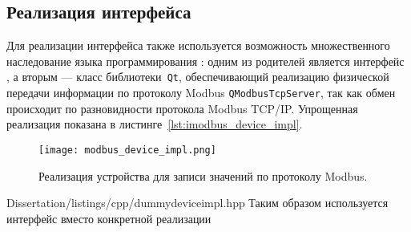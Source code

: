 \subsection{Реализация интерфейса \mbdevice}
Для реализации интерфейса \mbdevice также используется возможность множественного наследование языка программирования \cpp:
одним из родителей является интерфейс \mbdevice,
а вторым --- класс библиотеки~\texttt{Qt}, обеспечивающий реализацию физической передачи информации по протоколу Modbus
\texttt{QModbusTcpServer}, так как обмен происходит по разновидности протокола Modbus TCP/IP.
Упрощенная реализация показана в листинге~\ref{lst:imodbus_device_impl}.
\begin{figure}[hb!]\begin{center}
        \texttt{[image: modbus\_device\_impl.png]}
        \caption[Реализация интерфейса устройства записи.]
            {Реализация устройства для записи значений по протоколу Modbus.}\label{fig:modbus_device_imp}
\end{center}\end{figure}

        {Dissertation/listings/cpp/dummydeviceimpl.hpp}
Таким образом используется интерфейс вместо конкретной реализации \cite[стр. 47-48]{book:pattern:head_first}


